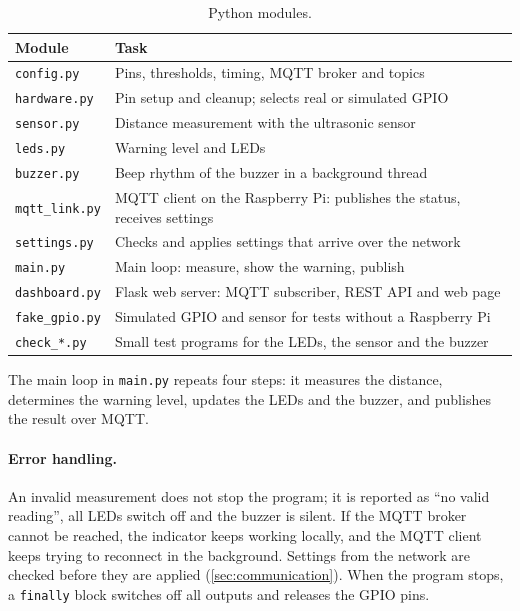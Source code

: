 \documentclass[11pt,a4paper]{article}
\begin{document}
\begin{table}[htbp]
  \centering
  \caption{Python modules.}
  \label{tab:modules}
  \begin{tabularx}{\textwidth}{@{}l X@{}}
    \toprule
    Module & Task \\
    \midrule
    \texttt{config.py}    & Pins, thresholds, timing, MQTT broker and topics \\
    \texttt{hardware.py}  & Pin setup and cleanup; selects real or simulated GPIO \\
    \texttt{sensor.py}    & Distance measurement with the ultrasonic sensor \\
    \texttt{leds.py}      & Warning level and LEDs \\
    \texttt{buzzer.py}    & Beep rhythm of the buzzer in a background thread \\
    \texttt{mqtt\_link.py} & MQTT client on the Raspberry Pi: publishes the status, receives settings \\
    \texttt{settings.py}  & Checks and applies settings that arrive over the network \\
    \texttt{main.py}      & Main loop: measure, show the warning, publish \\
    \texttt{dashboard.py} & Flask web server: MQTT subscriber, REST API and web page \\
    \texttt{fake\_gpio.py} & Simulated GPIO and sensor for tests without a Raspberry Pi \\
    \texttt{check\_*.py}  & Small test programs for the LEDs, the sensor and the buzzer \\
    \bottomrule
  \end{tabularx}
\end{table}

The main loop in \texttt{main.py} repeats four steps: it measures the distance,
determines the warning level, updates the LEDs and the buzzer, and publishes the
result over MQTT.

\paragraph{Error handling.} An invalid measurement does not stop the program; it
is reported as \enquote{no valid reading}, all LEDs switch off and the buzzer is
silent. If the MQTT broker cannot be reached, the indicator keeps working
locally, and the MQTT client keeps trying to reconnect in the background.
Settings from the network are checked before they are applied
(\cref{sec:communication}). When the program stops, a \texttt{finally} block
switches off all outputs and releases the GPIO pins.
\end{document}
